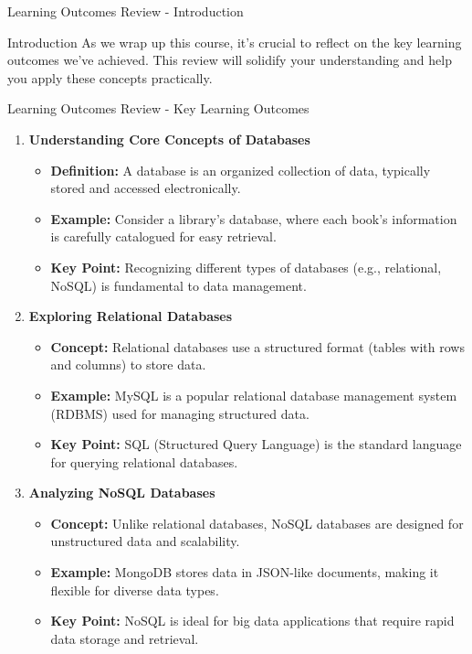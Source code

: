 \documentclass[aspectratio=169]{beamer}
\begin{document}
\begin{frame}[fragile]{Learning Outcomes Review - Introduction}
    \begin{block}{Introduction}
        As we wrap up this course, it's crucial to reflect on the key learning outcomes we’ve achieved. This review will solidify your understanding and help you apply these concepts practically.
    \end{block}
\end{frame}

\begin{frame}[fragile]{Learning Outcomes Review - Key Learning Outcomes}
    \begin{enumerate}
        \item \textbf{Understanding Core Concepts of Databases}
            \begin{itemize}
                \item \textbf{Definition:} A database is an organized collection of data, typically stored and accessed electronically.
                \item \textbf{Example:} Consider a library's database, where each book's information is carefully catalogued for easy retrieval.
                \item \textbf{Key Point:} Recognizing different types of databases (e.g., relational, NoSQL) is fundamental to data management.
            \end{itemize}
        
        \item \textbf{Exploring Relational Databases}
            \begin{itemize}
                \item \textbf{Concept:} Relational databases use a structured format (tables with rows and columns) to store data.
                \item \textbf{Example:} MySQL is a popular relational database management system (RDBMS) used for managing structured data.
                \item \textbf{Key Point:} SQL (Structured Query Language) is the standard language for querying relational databases.
            \end{itemize}

        \item \textbf{Analyzing NoSQL Databases}
            \begin{itemize}
                \item \textbf{Concept:} Unlike relational databases, NoSQL databases are designed for unstructured data and scalability.
                \item \textbf{Example:} MongoDB stores data in JSON-like documents, making it flexible for diverse data types.
                \item \textbf{Key Point:} NoSQL is ideal for big data applications that require rapid data storage and retrieval.
            \end{itemize}
    \end{enumerate}
\end{frame}
\end{document}
